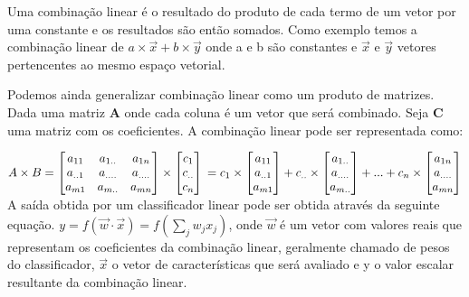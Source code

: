 \documentclass[12pt,journal,onecolumn]{IEEEtran}
\begin{document}
Uma combinação linear é o resultado do produto de cada termo de um vetor por uma
constante e os resultados são então somados. Como exemplo temos a combinação
linear de $a \times \overrightarrow{x} + b \times \overrightarrow{y}$ onde a e
b são constantes e $\overrightarrow{x}$ e $\overrightarrow{y}$ vetores
pertencentes ao mesmo espaço vetorial.

Podemos ainda generalizar combinação linear como um produto de matrizes.
Dada uma matriz \textbf{A} onde cada coluna é um vetor que será combinado.
Seja \textbf{C} uma matriz com os coeficientes. A combinação linear pode ser
representada como:
\newline 

$A \times B 
=
\begin{bmatrix}
 a_{11} & a_{1..} & a_{1n} \\ 
 a_{..1} & a_{....} & a_{....} \\ 
 a_{m1} & a_{m..} & a_{mn} \\ 
\end{bmatrix}
\times
\begin{bmatrix}
 c_{1} \\ c_{..} \\ c_{n}\\ 
\end{bmatrix}
\newline
=
c_{1} \times \begin{bmatrix} a_{11} \\ a_{..1} \\ a_{m1}\\  \end{bmatrix}
+
c_{..} \times \begin{bmatrix} a_{1..} \\ a_{....} \\ a_{m..}\\  \end{bmatrix}
+
...
+
c_{n} \times \begin{bmatrix} a_{1n} \\ a_{....} \\ a_{mn}\\  \end{bmatrix}$
\newline
A saída obtida por um classificador linear pode ser obtida através da seguinte
equação.
$y = f(\overrightarrow{w}\cdot\overrightarrow{x}) = f\left(\sum_j w_j x_j\right)$,
onde $\overrightarrow{w}$ é um vetor com valores reais que representam os
coeficientes da combinação linear, geralmente chamado de pesos do
classificador, $\overrightarrow{x}$ o vetor de características que será
avaliado e y o valor escalar resultante da combinação linear.
\end{document}
